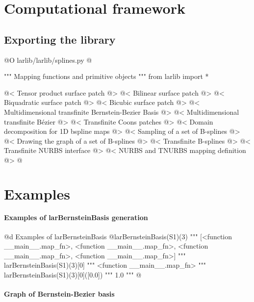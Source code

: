 \documentclass[11pt,oneside]{article}	%
\begin{document}
\section{Computational framework}
\subsection{Exporting the library}
@O larlib/larlib/splines.py
@{""" Mapping functions and primitive objects """
from larlib import *

@< Tensor product surface patch @>
@< Bilinear surface patch @>
@< Biquadratic surface patch @>
@< Bicubic surface patch @>
@< Multidimensional transfinite Bernstein-Bezier Basis @>
@< Multidimensional transfinite B\'ezier @>
@< Transfinite Coons patches @>
@< Domain decomposition for 1D bspline maps @>
@< Sampling of a set of B-splines @>
@< Drawing the graph of a set of B-splines @>
@< Transfinite B-splines @>
@< Transfinite NURBS interface @>
@< NURBS and TNURBS mapping definition @>
@}


\section{Examples}

\paragraph{Examples of larBernsteinBasis generation}

@d Examples of larBernsteinBasis
@{larBernsteinBasis(S1)(3) 
""" [<function __main__.map_fn>,
	<function __main__.map_fn>,
	<function __main__.map_fn>,
	<function __main__.map_fn>] """
larBernsteinBasis(S1)(3)[0]
""" <function __main__.map_fn> """
larBernsteinBasis(S1)(3)[0]([0.0])
""" 1.0 """
@}

\paragraph{Graph of Bernstein-Bezier basis}
\end{document}
